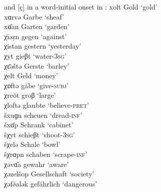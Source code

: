 \ea%
\label{ex:7:6}\relax[x] and [ç] in a word-initial onset in :
\ea\label{ex:7:6a} xolt          \tab [xɔlt]      \tab Gold         \tab  ‘gold’                    \\
    xɑrvə         \tab [xɑrvə]     \tab Garbe        \tab  ‘sheaf’                    \\
    x\={ɑ}an      \tab [xɑːɐn]     \tab Garten       \tab  ‘garden’                   \\
\ex\label{ex:7:6b} χīəẓn         \tab [çiːǝʝn̩]   \tab  gegen       \tab   ‘against’                \\
    χistan        \tab [çɪstan]    \tab gestern      \tab  ‘yesterday’                \\
    χyt           \tab [çʏt]       \tab gieβt        \tab  ‘water-\textsc{3sg}’      \\
    χɛ̄əštə        \tab [çɛːǝʃstǝ]  \tab Gerste       \tab  ‘barley’                   \\
    χelt          \tab [çɛlt]      \tab Geld         \tab  ‘money’                    \\
    χɒftə         \tab [çæftǝ]     \tab gäbe         \tab  ‘give-\textsc{subj}’       \\
\ex\label{ex:7:6c} χreŏt         \tab [çrɛɔt]     \tab groβ         \tab  ‘large’                    \\
    χloftə        \tab [çlɔftə]    \tab glaubte      \tab  ‘believe-\textsc{pret}’   \\
\ex\label{ex:7:6d} šxuɡn         \tab [ʃxʊɣn̩]    \tab  scheuen     \tab   ‘dread-\textsc{inf}’     \\
    šx\={ɑ}p      \tab [ʃxɑːp]     \tab Schrank       \tab  ‘cabinet’                  \\
\ex\label{ex:7:6e} šχyt          \tab [ʃçʏt]      \tab schieβt      \tab  ‘shoot-\textsc{3sg}’      \\
    šχelə         \tab [ʃçɛlə]     \tab Schale       \tab  ‘bowl’                     \\
\ex\label{ex:7:6f} šχrɑpn        \tab [ʃçrɑpn̩]   \tab  schaben     \tab   ‘scrape-\textsc{inf}’    \\
\ex\label{ex:7:6g} χəv\={ɑ}a     \tab [çəvɑːɐ]    \tab gewahr       \tab  ‘aware’                    \\
    χəzelšop      \tab [çəzɛlʃop]  \tab Gesellschaft \tab ‘society’                   \\
    χəf\={ø}alək  \tab [çəføːɐlək] \tab gefährlich   \tab ‘dangerous’                 \\
    \z
\z

